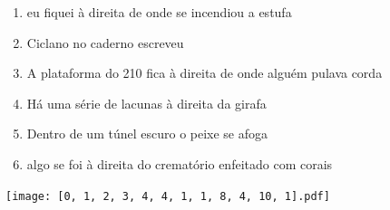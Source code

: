 \documentclass[12pt]{article}
\begin{document}
		 

\pagebreak


	\begin{enumerate}
		  \sffamily %
		  \large %


\vfill \item
eu fiquei	%
à direita
de onde se incendiou a estufa	%

\vfill \item
Ciclano	%
no caderno escreveu	%

\vfill \item
A plataforma do 210 fica	%
à direita
de onde alguém pulava corda	%

\vfill \item
Há uma série de lacunas	%
à direita
da girafa	%

\vfill \item
Dentro de um túnel escuro	%
o peixe se afoga	%

\vfill \item
algo se foi	%
à direita
do crematório enfeitado com corais	%
	\end{enumerate}
		  
		  \hfill

		  \vfill

\texttt{[image: [0, 1, 2, 3, 4, 4, 1, 1, 8, 4, 10, 1].pdf]}


	\hfill	  	  


\pagebreak			
\end{document}
